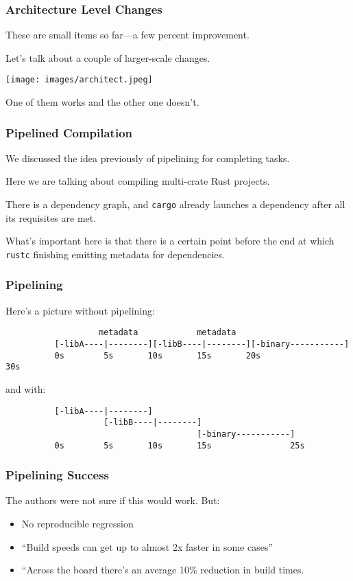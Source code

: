 \begin{frame}
\frametitle{Architecture Level Changes}
These are small items so far---a few percent improvement.

Let's talk about a couple of larger-scale changes. 

\begin{center}
	\texttt{[image: images/architect.jpeg]}
\end{center}

One of them works
and the other one doesn't.

\end{frame}


\begin{frame}
\frametitle{Pipelined Compilation}

We discussed the idea previously of pipelining for completing tasks.

Here we are talking about compiling multi-crate Rust projects. 

There is a dependency graph, and \texttt{cargo} already launches a dependency after all its requisites are met.

What's important here is that there is a certain point before the end at which \texttt{rustc}
finishing emitting
metadata for dependencies.

\end{frame}


\begin{frame}[fragile]
\frametitle{Pipelining}

 Here's a picture without pipelining:
{\scriptsize
\vspace*{-8em}
\begin{verbatim}
                   metadata            metadata
          [-libA----|--------][-libB----|--------][-binary-----------]
          0s        5s       10s       15s       20s                30s
\end{verbatim}
}
and with:
{\scriptsize
\vspace*{-8em}
\begin{verbatim}
          [-libA----|--------]
                    [-libB----|--------]
                                       [-binary-----------]
          0s        5s       10s       15s                25s
\end{verbatim}
}

\end{frame}

\begin{frame}
\frametitle{Pipelining Success}

The authors were not sure if this would work. But:
\vspace*{-6em}

\begin{itemize}
\item No reproducible regression
\item    ``Build speeds can get up to almost 2x faster in some cases''
\item    ``Across the board there's an average 10\% reduction in build times.\end{itemize}


\end{frame}


